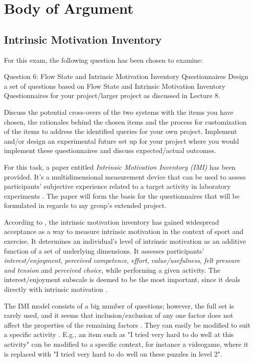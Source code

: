 \chapter{Body of Argument}
\section{Intrinsic Motivation Inventory}
For this exam, the following question has been chosen to examine:

\begin{fancyquotes}
Question 6: Flow State and Intrinsic Motivation Inventory Questionnaires
Design a set of questions based on Flow State and Intrinsic Motivation Inventory Questionnaires for your project/larger project as discussed in Lecture 8.

Discuss the potential cross-overs of the two systems with the items you have chosen, the rationales behind the chosen items and the process for customization of the items to address the identified queries for your own project. Implement and/or design an experimental future set up for your project where you would implement these questionnaires and discuss expected/actual outcomes. 

\end{fancyquotes}

For this task, a paper entitled \textit{Intrinsic Motivation Inventory (IMI)} has been provided. It's a multidimensional measurement device that can be used to assess participants' subjective experience related to a target activity in laboratory experiments \citep{imiOne}. The paper will form the basis for the questionnaires that will be formulated in regards to my group's extended project.

According to \cite{imiTwo}, the intrinsic motivation inventory has gained widespread acceptance as a way to measure intrinsic motivation in the context of sport and exercise. It determines an individual's level of intrinsic motivation as an additive function of a set of underlying dimensions. It assesses participants' \textit{interest/enjoyment}, \textit{perceived competence}, \textit{effort}, \textit{value/usefulness}, \textit{felt pressure and tension} and \textit{perceived choice}, while performing a given activity. The interest/enjoyment subscale is deemed to be the most important, since it deals directly with intrinsic motivation \citep{imiOne}.

The IMI model consists of a big number of questions; however, the full set is rarely used, and it seems that inclusion/exclusion of any one factor does not affect the properties of the remaining factors \citep{imiTwo}. They can easily be modified to suit a specific activity \citep{imiOne}. E.g., an item such as "I tried very hard to do well at this activity" can be modified to a specific context, for instance a videogame, where it is replaced with "I tried very hard to do well on these puzzles in level 2".

